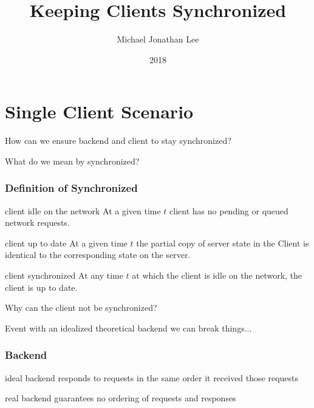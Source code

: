\documentclass{beamer}
\title{Keeping Clients Synchronized}
\author{Michael Jonathan Lee}
\institute{FH Kiel}
\date{2018}
\begin{document}
\maketitle

\section{Single Client Scenario}

\begin{frame}
    \centering
    How can we ensure backend and client to stay synchronized?
\end{frame}

\begin{frame}
    \centering
    What do we mean by synchronized?
\end{frame}

\begin{frame}
    \frametitle{Definition of Synchronized}

    \begin{block}{client idle on the network}
        At a given time $t$ client has no pending or queued network requests.
    \end{block}

    \begin{block}{client up to date}
        At a given time $t$ the partial copy of server state in the Client
        is identical to the corresponding state on the server.
    \end{block}

    \begin{block}{client synchronized}
        At any time $t$ at which the client is idle on the network, the client
        is up to date.
    \end{block}
\end{frame}

\begin{frame}
    \centering
    Why can the client not be synchronized?
\end{frame}

\begin{frame}
    \centering
    Event with an idealized theoretical backend we can break things...
\end{frame}

\begin{frame}
    \frametitle{Backend}
    \centering
    \begin{block}{ideal backend}
        responds to requests in the same order it received those requests
    \end{block}
    \begin{block}{real backend}
        guarantees no ordering of requests and responses
    \end{block}
\end{frame}
\end{document}
